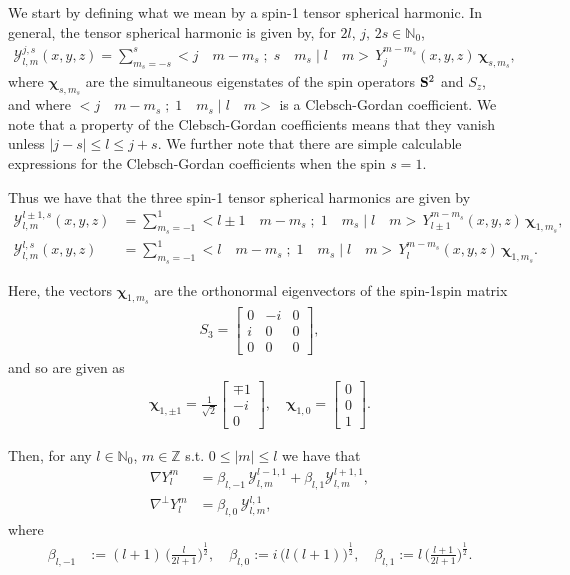 \documentclass[11pt, oneside]{article}   	%
\newcommand{\half}{\frac{1}{2}}
\newcommand{\Z}{\mathbb{Z}}
\newcommand{\No}{\mathbb{N}_0}
\newcommand{\Ylm}{Y^m_l}
\newcommand{\curlyy}{\bm{\mathcal{Y}}}
\newcommand{\blone}{\beta_{l, 1}}
\newcommand{\blzero}{\beta_{l, 0}}
\newcommand{\blmone}{\beta_{l, -1}}
\newcommand{\chivec}{\bm{\chi}_{1,m_s}}
\begin{document}
We start by defining what we mean by a spin-1 tensor spherical harmonic. In general, the tensor spherical harmonic is given by, for \(2l, \, j, \, 2s \in \No\),
\begin{align}
\curlyy^{j,s}_{l,m}(x,y,z) = \sum_{m_s=-s}^s < j \quad m-m_s \; ; \; s \quad m_s \; | \; l \quad m > \, Y^{m-m_s}_j (x,y,z) \, \bm{\chi}_{s, m_s},
\end{align}
where \(\bm{\chi}_{s, m_s}\) are the simultaneous eigenstates of the spin operators \(\bold{S}^2\) and \(S_z\), and where \(< j \quad m-m_s \; ; \; 1 \quad m_s \; | \; l \quad m >\) is a Clebsch-Gordan coefficient. We note that a property of the Clebsch-Gordan coefficients means that they vanish unless \(|j - s| \le l \le j + s\). We further note that there are simple calculable expressions for the Clebsch-Gordan coefficients when the spin \(s=1\).

Thus we have that the three spin-1 tensor spherical harmonics are given by
\begin{align}
\curlyy^{l \pm1,s}_{l,m}(x,y,z) &= \sum_{m_s=-1}^1 < l \pm 1 \quad m-m_s \; ; \; 1 \quad m_s \; | \; l \quad m > \, Y^{m-m_s}_{l \pm 1} (x,y,z) \, \chivec, \\
\curlyy^{l,s}_{l,m}(x,y,z) &= \sum_{m_s=-1}^1 < l \quad m-m_s \; ; \; 1 \quad m_s \; | \; l \quad m > \, Y^{m-m_s}_l (x,y,z) \, \chivec.
\end{align}

Here, the vectors \(\chivec\) are the orthonormal eigenvectors of the spin-1spin matrix 
\begin{align}
S_3 = \begin{bmatrix} 0 & -i & 0 \\ i & 0 & 0 \\ 0 & 0 & 0 \end{bmatrix},
\end{align}
and so are given as
\begin{align}
\bm{\chi}_{1, \pm 1} = \frac{1}{\sqrt{2}} \begin{bmatrix} \mp 1 \\ -i \\ 0 \end{bmatrix}, \quad \bm{\chi}_{1,0} = \begin{bmatrix} 0 \\ 0 \\ 1 \end{bmatrix}.
\end{align}

Then, for any \(l \in \No\), \(m \in \Z\) s.t. \(0 \le |m| \le l\) we have that
\begin{align}
\nabla \Ylm &= \blmone \, \curlyy^{l-1,1}_{l,m} + \blone \curlyy^{l+1,1}_{l,m}, \\
\nabla^\perp \Ylm &= \blzero \, \curlyy^{l,1}_{l,m},
\end{align}
where
\begin{align}
\blmone &:= (l+1) \, \Big(\frac{l}{2l+1}\Big)^\half, \quad
\blzero := i \, \big(l(l+1)\big)^\half, \quad
\blone := l \, \Big(\frac{l+1}{2l+1}\Big)^\half.
\end{align}
\end{document}

